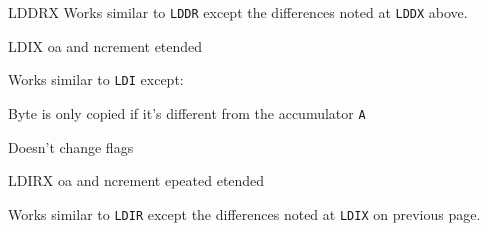 \begin{basedescript}{
	\desclabelstyle{\multilinelabel}
	\desclabelwidth{3cm}}
\begin{DetailItem}{LDDRX\ZXN}
		Works similar to {\tt LDDR} except the differences noted at {\tt LDDX} above.

		\begin{DetailEffects}
			\FlagsLDDRX
		\end{DetailEffects}
					
		\begin{DetailTiming}
			\DetailTimeRegular[{\tt BC}=0]{4}{16}
			\DetailTimeRegular[{\tt BC}$\neq$0]{5}{21}
		\end{DetailTiming}

	\end{DetailItem}

	\label{DetailRefLDIX}
	\begin{DetailItem}{LDIX\ZXN}
		{oa and ncrement etended}		
		{\SymLDIX}

		Works similar to {\tt LDI} except:
		\begin{DetailCompactList}
			\item Byte is only copied if it's different from the accumulator {\tt A}
			\item Doesn't change flags
		\end{DetailCompactList}

		\begin{DetailEffects}
			\FlagsLDIX
		\end{DetailEffects}
				
		\begin{DetailTiming}
			\DetailTime{4}{16}
		\end{DetailTiming}

	\end{DetailItem}

	\label{DetailRefLDIRX}
	\begin{DetailItem}{LDIRX\ZXN}
		{oa and ncrement epeated etended}		
		{\SymLDIRX}

		Works similar to {\tt LDIR} except the differences noted at {\tt LDIX} on previous page.

		\begin{DetailEffects}
			\FlagsLDIRX
		\end{DetailEffects}
				
		\begin{DetailTiming}
		\end{DetailTiming}

	\end{DetailItem}


\end{basedescript}
